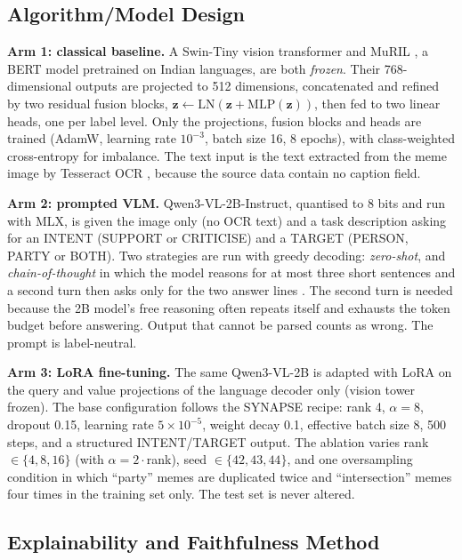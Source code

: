 \subsection{Algorithm/Model Design}

\textbf{Arm 1: classical baseline.} A Swin-Tiny vision transformer \cite{liu2021swin} and MuRIL \cite{khanuja2021muril}, a BERT model pretrained on Indian languages, are both \emph{frozen}. Their 768-dimensional outputs are projected to 512 dimensions, concatenated and refined by two residual fusion blocks, $\mathbf{z}\leftarrow \mathrm{LN}(\mathbf{z}+\mathrm{MLP}(\mathbf{z}))$, then fed to two linear heads, one per label level. Only the projections, fusion blocks and heads are trained (AdamW, learning rate $10^{-3}$, batch size 16, 8 epochs), with class-weighted cross-entropy for imbalance. The text input is the text extracted from the meme image by Tesseract OCR \cite{smith2007tesseract}, because the source data contain no caption field.

\textbf{Arm 2: prompted VLM.} Qwen3-VL-2B-Instruct, quantised to 8 bits and run with MLX, is given the image only (no OCR text) and a task description asking for an INTENT (SUPPORT or CRITICISE) and a TARGET (PERSON, PARTY or BOTH). Two strategies are run with greedy decoding: \emph{zero-shot}, and \emph{chain-of-thought} \cite{wei2022cot} in which the model reasons for at most three short sentences and a second turn then asks only for the two answer lines \cite{kojima2022zeroshot}. The second turn is needed because the 2B model's free reasoning often repeats itself and exhausts the token budget before answering. Output that cannot be parsed counts as wrong. The prompt is label-neutral.

\textbf{Arm 3: LoRA fine-tuning.} The same Qwen3-VL-2B is adapted with LoRA \cite{hu2022lora} on the query and value projections of the language decoder only (vision tower frozen). The base configuration follows the SYNAPSE recipe: rank 4, $\alpha=8$, dropout 0.15, learning rate $5\times10^{-5}$, weight decay 0.1, effective batch size 8, 500 steps, and a structured INTENT/TARGET output. The ablation varies rank $\in\{4,8,16\}$ (with $\alpha=2\cdot$rank), seed $\in\{42,43,44\}$, and one oversampling condition in which ``party'' memes are duplicated twice and ``intersection'' memes four times in the training set only. The test set is never altered.

\subsection{Explainability and Faithfulness Method}

